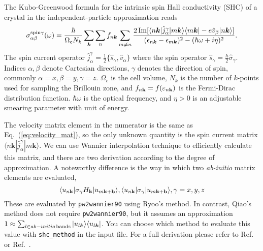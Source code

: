 The Kubo-Greenwood formula for the intrinsic spin Hall conductivity (SHC) of a crystal
in the independent-particle approximation reads \cite{qiao-prb2018,ryoo-prb2019,guo-prl2008}
%
\begin{equation}
\label{eq:kubo_shc}
\sigma_{\alpha\beta}^{\text{spin}\gamma}(\omega) =  \frac{\hbar}{\Omega_c N_k}
\sum_{\bm{k}}\sum_{n} f_{n\bm{k}} \\
\sum_{m \neq n}
\frac{2\operatorname{Im}[\langle n\bm{k}| \hat{j}_{\alpha}^{\gamma}|m\bm{k}\rangle
	\langle m\bm{k}| -e\hat{v}_{\beta}|n\bm{k}\rangle]}
{(\epsilon_{n\bm{k}}-\epsilon_{m\bm{k}})^2-(\hbar\omega +i\eta)^2}.
\end{equation}
%
The spin current operator 
$\hat{j}_{\alpha}^{\gamma}=
\frac{1}{2}\{\hat{s}_{\gamma},\hat{v}_{\alpha}\}$ where the spin operator $\hat{s}_{\gamma}=\frac{\hbar}{2}\hat{\sigma}_{\gamma}$. Indices $\alpha,\beta$ denote Cartesian directions, $\gamma$ denotes the direction of spin, commonly $\alpha = x, \beta = y, \gamma = z$.  $\Omega_c$ is the
cell volume, $N_k$ is the number of $k$-points used for sampling the
Brillouin zone, and $f_{n{\bf k}}=f(\varepsilon_{n{\bf k}})$ is the
Fermi-Dirac distribution function. $\hbar\omega$ is the optical
frequency, and $\eta>0$ is an adjustable smearing parameter with unit
of energy.

The velocity matrix element in the numerator is the same as   Eq.~(\ref{eq:velocity_mat}), 
so the only unknown quantity is the spin current matrix $\langle n\bm{k}| \hat{j}_{\alpha}^{\gamma}|m\bm{k}\rangle$. 
We can use Wannier interpolation technique to efficiently calculate this matrix, and there are two derivation according to the degree of approximation. A noteworthy difference is the way in which two {\it ab-initio} matrix elements are evaluated,
\begin{equation}
  \langle u_{n{\bf k}}\vert\sigma_\gamma H_{\bf k}\vert u_{m{\bf k}+{\bf b}}\rangle, \langle u_{n{\bf k}}\vert\sigma_\gamma \vert u_{m{\bf k}+{\bf b}}\rangle, \gamma = x, y, z
\end{equation}
These are evaluated by {\tt pw2wannier90} using Ryoo's method. In contrast, Qiao's method does not require {\tt pw2wannier90}, but it assumes an approximation $1\approx\sum_{ l\in ab-initio{\rm \,bands}}|u_{l\bm{k}}\rangle \langle u_{l\bm{k}}|$. You can choose which method to evaluate this value with {\tt shc\_method} in the input file. For a full derivation please refer to Ref.~\cite{qiao-prb2018} or Ref.~\cite{ryoo-prb2019}.

